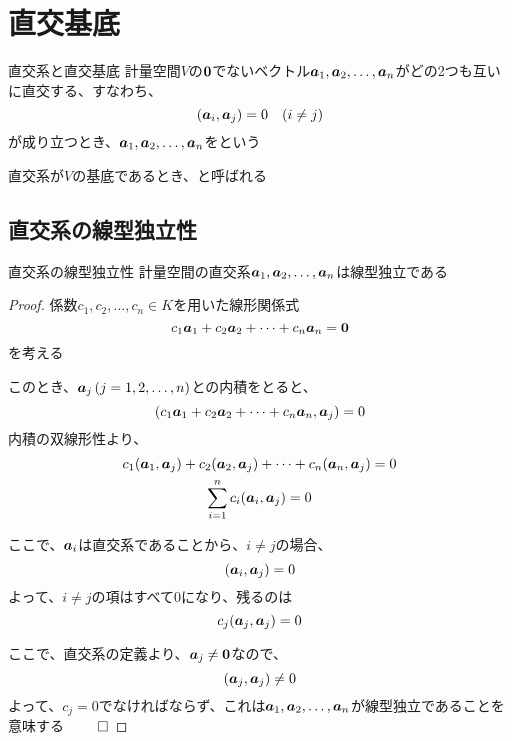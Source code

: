 \documentclass[../../../topic_linear-algebra]{subfiles}
\begin{document}
\sectionline
\section{直交基底}

\begin{definition}{直交系と直交基底}
  計量空間$V$の$\vb*{0}$でないベクトル$\vb*{a}_1, \vb*{a}_2, \ldots, \vb*{a}_n$がどの2つも互いに直交する、すなわち、
  \begin{equation*}
    (\vb*{a}_i, \vb*{a}_j) = 0 \quad (i \neq j)
  \end{equation*}
  が成り立つとき、$\vb*{a}_1, \vb*{a}_2, \ldots, \vb*{a}_n$をという

  直交系が$V$の基底であるとき、と呼ばれる
\end{definition}

\subsection{直交系の線型独立性}

\begin{theorem}{直交系の線型独立性}\label{thm:orthogonal-set-is-independent}
  計量空間の直交系$\vb*{a}_1, \vb*{a}_2, \ldots, \vb*{a}_n$は線型独立である
\end{theorem}

\begin{proof}
  係数$c_1, c_2, \ldots, c_n \in K$を用いた線形関係式
  \begin{equation*}
    c_1 \vb*{a}_1 + c_2 \vb*{a}_2 + \cdots + c_n \vb*{a}_n = \vb*{0}
  \end{equation*}
  を考える

  このとき、$\vb*{a}_j \, (j=1,2,\ldots,n)$との内積をとると、
  \begin{equation*}
    (c_1 \vb*{a}_1 + c_2 \vb*{a}_2 + \cdots + c_n \vb*{a}_n, \vb*{a}_j) = 0
  \end{equation*}
  内積の双線形性より、
  \begin{gather*}
    c_1 (\vb*{a}_1, \vb*{a}_j) + c_2 (\vb*{a}_2, \vb*{a}_j) + \cdots + c_n (\vb*{a}_n, \vb*{a}_j) = 0 \\
    \sum_{i=1}^n c_i (\vb*{a}_i, \vb*{a}_j) = 0
  \end{gather*}

  ここで、$\vb*{a}_i$は直交系であることから、$i \neq j$の場合、
  \begin{equation*}
    (\vb*{a}_i, \vb*{a}_j) = 0
  \end{equation*}
  よって、$i \neq j$の項はすべて0になり、残るのは
  \begin{equation*}
    c_j (\vb*{a}_j, \vb*{a}_j) = 0
  \end{equation*}

  ここで、直交系の定義より、$\vb*{a}_j \neq \vb*{0}$なので、
  \begin{equation*}
    (\vb*{a}_j, \vb*{a}_j) \neq 0
  \end{equation*}
  よって、$c_j = 0$でなければならず、これは$\vb*{a}_1, \vb*{a}_2, \ldots, \vb*{a}_n$が線型独立であることを意味する $\qed$
\end{proof}
\end{document}
